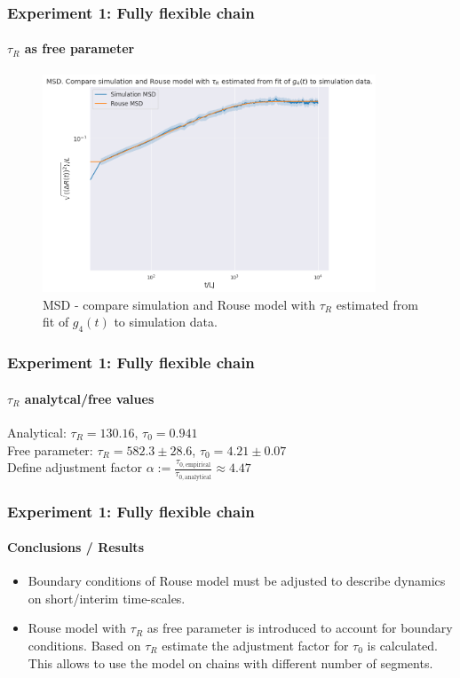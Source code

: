 \documentclass[handout]{beamer}
\begin{document}
\begin{frame}
    \frametitle{Experiment 1: Fully flexible chain}
    \framesubtitle{$\tau_R$ as free parameter}

    \begin{figure}[h]
        \includegraphics[trim={0.1cm 0.1cm 0.1cm 1cm},clip,height=6.5cm]{./3-exp-free-param-log.png}
        \caption{MSD - compare simulation and Rouse model 
        with $\tau_R$ estimated from fit of $g_4(t)$ to simulation data.}
        \label{fig:full-flex-chain-free-log}
    \end{figure}
\end{frame}


\begin{frame}
    \frametitle{Experiment 1: Fully flexible chain}
    \framesubtitle{$\tau_R$ analytcal/free values}

    Analytical: $\tau_R=130.16$, $\tau_0=0.941$
    \\
    Free parameter: $\tau_R=582.3 \pm 28.6$, $\tau_0=4.21 \pm 0.07$
    \\
    \vspace{1cm}
    Define adjustment factor
    $ \alpha := \frac{\tau_{0, \textrm{empirical}}}{\tau_{0, \textrm{analytical}}} \approx 4.47$
\end{frame}

\begin{frame}
    \frametitle{Experiment 1: Fully flexible chain}
    \framesubtitle{Conclusions / Results}
    \begin{itemize}
        \item Boundary conditions of Rouse model must be adjusted to describe dynamics on 
        short/interim time-scales.
        \item Rouse model with $\tau_R$ as free parameter is introduced to account for boundary
        conditions. Based on $\tau_R$ estimate the adjustment factor for $\tau_0$ is calculated.
        This allows to use the model on chains with different number of segments.

    \end{itemize}
\end{frame}
\end{document}
